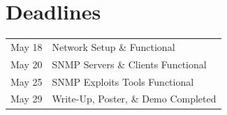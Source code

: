 \documentclass[pdftex, 11pt]{article}
\begin{document}
\section{Deadlines}

\begin{center}
\begin{tabular}{l l}
  May 18 & Network Setup \& Functional \\
  May 20 & SNMP Servers \& Clients Functional \\
  May 25 & SNMP Exploits Tools Functional \\
  May 29 & Write-Up, Poster, \& Demo Completed \\
\end{tabular}
\end{center}
\end{document}
